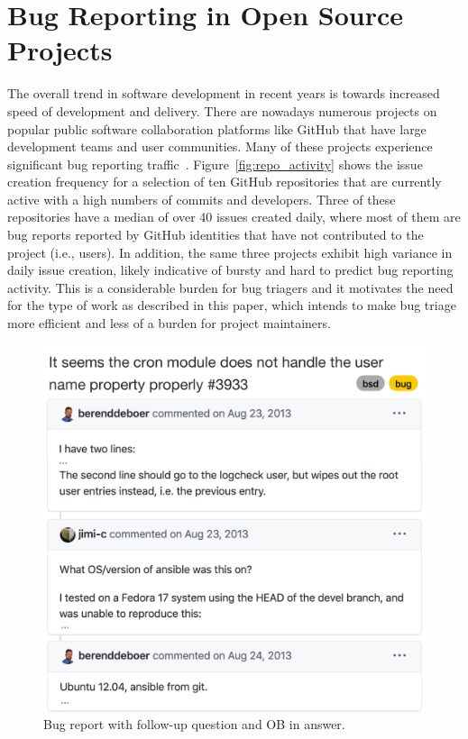 \section{Bug Reporting in Open Source Projects}


The overall trend in software development in recent years is towards increased
speed of development and delivery. There are nowadays numerous projects on popular
public software collaboration platforms like GitHub that have large development
teams and user communities. Many of these projects experience significant
bug reporting traffic~\cite{Zhang2014ASO}. Figure~\ref{fig:repo_activity} shows the issue creation
frequency for a selection of ten GitHub repositories that are currently active
with a high numbers of commits and developers. Three of these repositories have
a median of over 40 issues created daily, where most of them are bug reports reported by
GitHub identities that have not contributed to the project (i.e., users). In addition,
the same three projects exhibit high variance in daily issue creation, likely indicative
of bursty and hard to predict bug reporting activity. This is a
considerable burden for bug triagers and it motivates the need for the type of work
as described in this paper, which intends to make bug triage more efficient and less of
a burden for project maintainers.


\begin{figure}[t]
\centering
\includegraphics[width=0.95\linewidth]{figures/bug_report.pdf}
\caption{Bug report with follow-up question and OB in answer.}
\label{fig:bug_report}
\end{figure}

